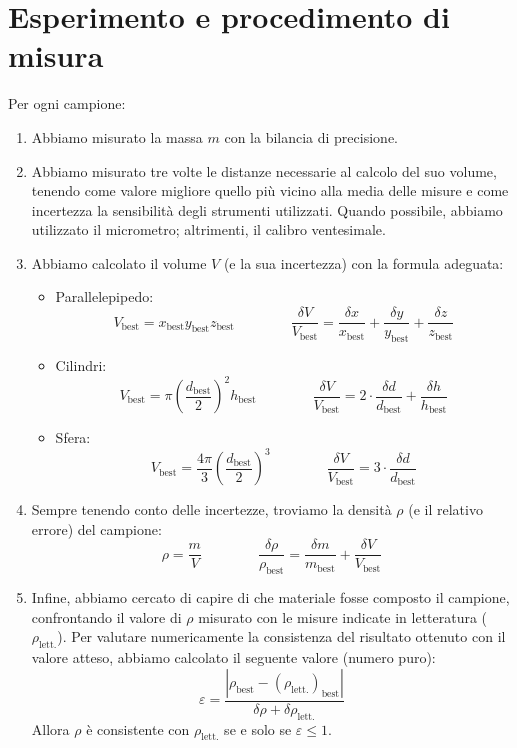 \documentclass{article}
\begin{document}
\section{Esperimento e procedimento di misura}
Per ogni campione:
\begin{enumerate}
    \item Abbiamo misurato la massa $m$ con la bilancia di precisione.
    \item Abbiamo misurato tre volte le distanze necessarie al calcolo
          del suo volume, tenendo come valore migliore quello più vicino alla media
          delle misure e come incertezza la sensibilità degli strumenti utilizzati.
          Quando possibile, abbiamo utilizzato il micrometro; altrimenti, il calibro ventesimale.
    \item Abbiamo calcolato il volume $V$ (e la sua incertezza) con la formula adeguata:
    \begin{itemize}
        \item Parallelepipedo:
            \[
                V_\text{best} = x_\text{best} y_\text{best} z_\text{best}
                \qquad\qquad
                \frac{\delta V}{V_\text{best}} = \frac{\delta x}{x_\text{best}} + \frac{\delta y}{y_\text{best}} + \frac{\delta z}{z_\text{best}}
            \]
        \item Cilindri:
            \[
                V_\text{best} = \pi \left(\frac{d_\text{best}}{2}\right)^2 h_\text{best}
                \qquad\qquad
                \frac{\delta V}{V_\text{best}} = 2 \cdot \frac{\delta d}{d_\text{best}} + \frac{\delta h}{h_\text{best}}
            \]
        \item Sfera:
            \[
                V_\text{best} = \frac{4 \pi}{3} \left(\frac{d_\text{best}}{2}\right)^3
                \qquad\qquad
                \frac{\delta V}{V_\text{best}} = 3 \cdot \frac{\delta d}{d_\text{best}}
            \]
    \end{itemize}
    \item Sempre tenendo conto delle incertezze, troviamo la densità $\rho$ (e il relativo errore) del campione:
        \[
            \rho = \frac{m}{V}
            \qquad\qquad
            \frac{\delta \rho}{\rho_\text{best}} = \frac{\delta m}{m_\text{best}} + \frac{\delta V}{V_\text{best}}
        \]
    \item Infine, abbiamo cercato di capire di che materiale fosse composto il campione, confrontando
    il valore di $\rho$ misurato con le misure indicate in letteratura ($\rho_\text{lett.}$).
    Per valutare numericamente la consistenza del risultato ottenuto con il valore atteso,
    abbiamo calcolato il seguente valore (numero puro):
    \[\varepsilon = \frac{\left|\rho_\text{best} - \left(\rho_\text{lett.}\right)_\text{best}\right|}{\delta \rho + \delta \rho_\text{lett.}}\]
    Allora $\rho$ è consistente con $\rho_\text{lett.}$ se e solo se $\varepsilon \le 1$.
\end{enumerate}
\end{document}
